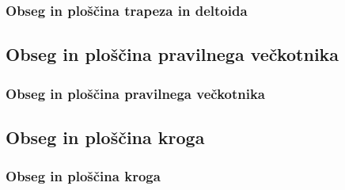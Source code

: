         \begin{frame}
            \frametitle{Obseg in ploščina trapeza in deltoida}
        \end{frame}

    \subsection{Obseg in ploščina pravilnega večkotnika}

        \begin{frame}
            \frametitle{Obseg in ploščina pravilnega večkotnika}
        \end{frame}

    \subsection{Obseg in ploščina kroga}

        \begin{frame}
            \frametitle{Obseg in ploščina kroga}
        \end{frame}

